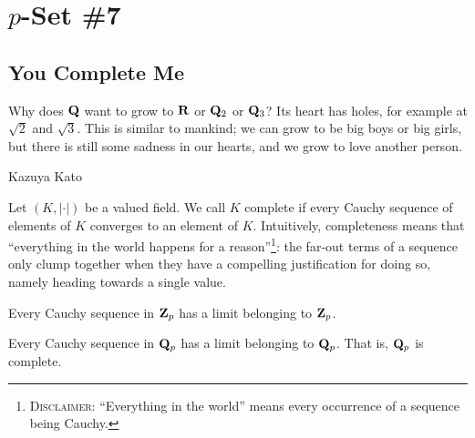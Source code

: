\chapter*{$p$-Set \#7}



\section*{You Complete Me}
\epigraph{Why does $\mathbf{Q}$ want to grow to $\mathbf{R}$ or $\mathbf{Q}_2$ or $\mathbf{Q}_3$? Its heart has holes, for example at $\sqrt{2}$ and $\sqrt{3}$. This
is similar to mankind; we can grow to be big boys or big girls, but there is still some sadness in our hearts, and we grow to love another person.}{Kazuya Kato}
\setlength{\epigraphwidth}{0.45\textwidth}  

 
Let $(K,|\cdot|)$ be a valued field. We call $K$ \textsf{complete} if every Cauchy sequence of elements of $K$ converges to an element of $K$. Intuitively, completeness means that ``everything in the world happens for a reason''\footnote{\textsc{Disclaimer}: ``Everything in the world'' means every occurrence of a sequence being Cauchy.}: the far-out terms of a sequence only clump together when they have a compelling justification for doing so, namely heading towards a single value.

\begin{prob}\label{ex:zpcomplete}\label{prob:76} Every Cauchy sequence in $\mathbf{Z}_p$ has a limit belonging to $\mathbf{Z}_p$.
\end{prob}

\begin{prob}\label{ex:qpcomplete}\label{prob:77} Every Cauchy sequence in $\mathbf{Q}_p$ has a limit belonging to $\mathbf{Q}_p$. That is, $\mathbf{Q}_p$ is complete.
\end{prob}

